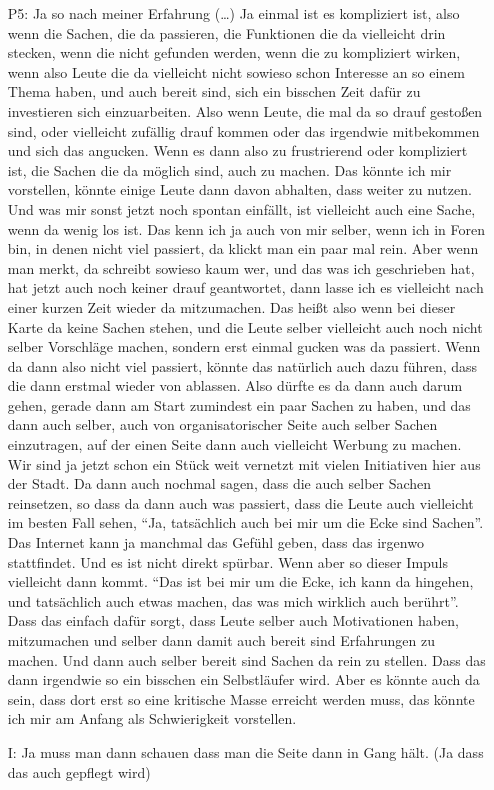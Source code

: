 \begin{itemize}
    \item[P5:] Ja so nach meiner Erfahrung (\dots) Ja einmal ist es kompliziert ist, also wenn die Sachen, die da passieren, die Funktionen die da vielleicht drin stecken, wenn die nicht gefunden werden, wenn die zu kompliziert wirken, wenn also Leute die da vielleicht nicht sowieso schon Interesse an so einem Thema haben, und auch bereit sind, sich ein bisschen Zeit daf{\"u}r zu investieren sich einzuarbeiten. Also wenn Leute, die mal da so drauf gesto{\ss}en sind, oder vielleicht zuf{\"a}llig drauf kommen oder das irgendwie mitbekommen und sich das angucken. Wenn es dann also zu frustrierend oder kompliziert ist, die Sachen die da m{\"o}glich sind, auch zu machen. Das k{\"o}nnte ich mir vorstellen, k{\"o}nnte einige Leute dann davon abhalten, dass weiter zu nutzen. Und was mir sonst jetzt noch spontan einf{\"a}llt, ist vielleicht auch eine Sache, wenn da wenig los ist. Das kenn ich ja auch von mir selber, wenn ich in Foren bin, in denen nicht viel passiert, da klickt man ein paar mal rein. Aber wenn man merkt, da schreibt sowieso kaum wer, und das was ich geschrieben hat, hat jetzt auch noch keiner drauf geantwortet, dann lasse ich es vielleicht nach einer kurzen Zeit wieder da mitzumachen. Das hei{\ss}t also wenn bei dieser Karte da keine Sachen stehen, und die Leute selber vielleicht auch noch nicht selber Vorschl{\"a}ge machen, sondern erst einmal gucken was da passiert. Wenn da dann also nicht viel passiert, k{\"o}nnte das nat{\"u}rlich auch dazu f{\"u}hren, dass die dann erstmal wieder von ablassen. Also d{\"u}rfte es da dann auch darum gehen, gerade dann am Start zumindest ein paar Sachen zu haben, und das dann auch selber, auch von organisatorischer Seite auch selber Sachen einzutragen, auf der einen Seite dann auch vielleicht Werbung zu machen. Wir sind ja jetzt schon ein St{\"u}ck weit vernetzt mit vielen Initiativen hier aus der Stadt. Da dann auch nochmal sagen, dass die auch selber Sachen reinsetzen, so dass da dann auch was passiert, dass die Leute auch vielleicht im besten Fall sehen, "`Ja, tats{\"a}chlich auch bei mir um die Ecke sind Sachen"'. Das Internet kann ja manchmal das Gef{\"u}hl geben, dass das irgenwo stattfindet. Und es ist nicht direkt sp{\"u}rbar. Wenn aber so dieser Impuls vielleicht dann kommt. "`Das ist bei mir um die Ecke, ich kann da hingehen, und tats{\"a}chlich auch etwas machen, das was mich wirklich auch ber{\"u}hrt"'. Dass das einfach daf{\"u}r sorgt, dass Leute selber auch Motivationen haben, mitzumachen und selber dann damit auch bereit sind Erfahrungen zu machen. Und dann auch selber bereit sind Sachen da rein zu stellen. Dass das dann irgendwie so ein bisschen ein Selbstl{\"a}ufer wird. Aber es k{\"o}nnte auch da sein, dass dort erst so eine kritische Masse erreicht werden muss, das k{\"o}nnte ich mir am Anfang als Schwierigkeit vorstellen.
    \item[I:] Ja muss man dann schauen dass man die Seite dann in Gang h{\"a}lt. (Ja dass das auch gepflegt wird)
\end{itemize}

